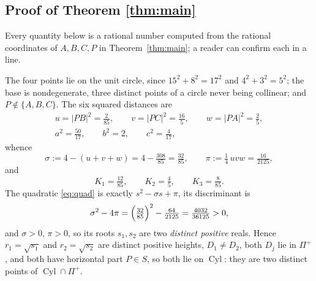 \documentclass[11pt]{amsart}
\theoremstyle{remark}
\DeclareMathOperator{\Cyl}{Cyl}
\begin{document}
\subsection*{Proof of Theorem \ref{thm:main}}
Every quantity below is a rational number computed from the rational coordinates of
$A,B,C,P$ in Theorem~\ref{thm:main}; a reader can confirm each in a line.

The four points lie on the unit circle, since $15^{2}+8^{2}=17^{2}$ and
$4^{2}+3^{2}=5^{2}$; the base is nondegenerate, three distinct points of a circle never
being collinear; and $P\notin\{A,B,C\}$. The six squared distances are
\begin{equation}\label{eq:lengths}
 \begin{gathered}
 u=|PB|^{2}=\tfrac{2}{85},\qquad v=|PC|^{2}=\tfrac{16}{5},\qquad w=|PA|^{2}=\tfrac25,\\
 a^{2}=\tfrac{50}{17},\qquad b^{2}=2,\qquad c^{2}=\tfrac{4}{17},
 \end{gathered}
\end{equation}
whence
\begin{equation}\label{eq:sigmapi}
 \sigma:=4-(u+v+w)=4-\tfrac{308}{85}=\tfrac{32}{85},
 \qquad
 \pi:=\tfrac14\,uvw=\tfrac{16}{2125},
\end{equation}
and
\[
 K_1=\tfrac{12}{85},\qquad K_2=\tfrac45,\qquad K_3=\tfrac{8}{85}.
\]
The quadratic \eqref{eq:quad} is exactly $s^{2}-\sigma s+\pi$, its discriminant is
\begin{equation}\label{eq:disc}
 \sigma^{2}-4\pi=\Bigl(\tfrac{32}{85}\Bigr)^{2}-\tfrac{64}{2125}
 =\tfrac{4032}{36125}>0,
\end{equation}
and $\sigma>0$, $\pi>0$, so its roots $s_1,s_2$ are two \emph{distinct positive} reals. Hence
$r_1=\sqrt{s_1}$ and $r_2=\sqrt{s_2}$ are distinct positive heights, $D_1\neq D_2$, both
$D_j$ lie in $\Pi^{+}$, and both have horizontal part $P\in S$, so both lie on $\Cyl$: they
are two distinct points of $\Cyl\cap\Pi^{+}$.
\end{document}
